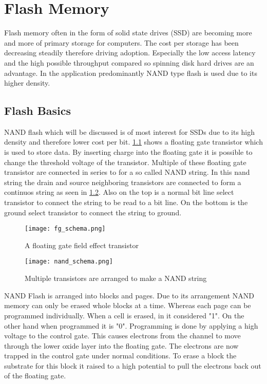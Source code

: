 
\chapter{Flash Memory}
Flash memory often in the form of solid state drives (SSD) are becoming more and more of primary storage for computers. The cost per storage has been decreasing steadily therefore driving adoption. Especially the low access latency and the high possible throughput compared so spinning disk hard drives are an advantage. In the application predominantly NAND type flash is used due to its higher density. 


\section{Flash Basics}
NAND flash which will be discussed is of most interest for SSDs due to its high density and therefore lower cost per bit. \cref{fg_tans} shows a floating gate transistor which is used to store data. By inserting charge into the floating gate it is possible to change the threshold voltage of the transistor. Multiple of these floating gate transistor are connected in series to for a so called NAND string. In this nand string the drain and source neighboring transistors are connected to form a continuos string as seen in \cref{nand_string}. Also on the top is a normal bit line select transistor to connect the string to be read to a bit line. On the bottom is the ground select transistor to connect the string to ground\cite[p.~22-24]{MiMa18}.

\begin{figure}
    \texttt{[image: fg\_schema.png]}
    \centering
    \caption{A floating gate field effect transistor}
    \label{fg_tans}
\end{figure}


\begin{figure}
    \texttt{[image: nand\_schema.png]}
    \centering
    \caption{Multiple transistors are arranged to make a NAND string}
    \label{nand_string}
\end{figure}

NAND Flash is arranged into blocks and pages. Due to its arrangement NAND memory can only be erased whole blocks at a time. Whereas each page can be programmed individually. When a cell is erased, in it considered "1". On the other hand when programmed it is "0". Programming is done by applying a high voltage to the control gate. This causes electrons from the channel to move through the lower oxide layer into the floating gate. The electrons are now trapped in the control gate under normal conditions. To erase a block the substrate for this block it raised to a high potential to pull the electrons back out of the floating gate\cite{RiTo98}.

